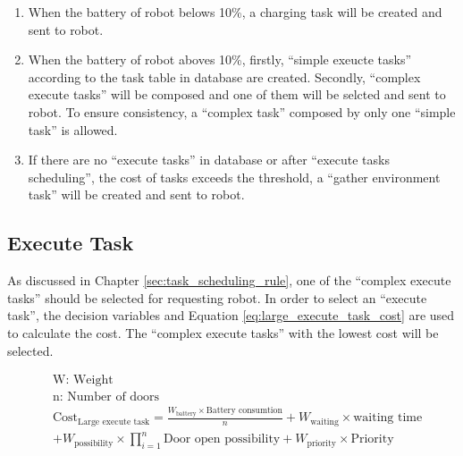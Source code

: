 \begin{enumerate}
	\label{sec:task_scheduling_rule}
	\item When the battery of robot belows 10\%, a charging task will be created and sent to robot.
	\item When the battery of robot aboves 10\%, firstly, ``simple exeucte tasks'' according to the task table in database are created. Secondly, ``complex execute tasks'' will be composed and one of them will be selcted and sent to robot. To ensure consistency, a ``complex task'' composed by only one ``simple task'' is allowed. 
    \item If there are no ``execute tasks'' in database or after ``execute tasks scheduling'', the cost of tasks exceeds the threshold, a ``gather environment task'' will be created and sent to robot.
\end{enumerate}

\subsection{Execute Task}
As discussed in Chapter \ref{sec:task_scheduling_rule}, one of the ``complex execute tasks'' should be selected for requesting robot. In order to select an ``execute task'', the decision variables and Equation \ref{eq:large_execute_task_cost} are used to calculate the cost. The ``complex execute tasks'' with the lowest cost will be selected.

\begin{equation}
	\label{eq:large_execute_task_cost} 
	\begin{aligned}
	& \mbox{W: Weight } \\
	& \mbox{n: Number of doors} \\
	& \mbox{Cost}_{\mbox{Large execute task}} = \frac{W_{\mbox{battery}} \times \mbox{Battery consumtion}}{n} + W_{\mbox{waiting}} \times \mbox{waiting time} \\
	& + W_{\mbox{possibility}} \times \prod\limits_{i=1}^n \mbox{Door open possibility}  + W_{\mbox{priority}} \times \mbox{Priority}
	\end{aligned}
\end{equation}

